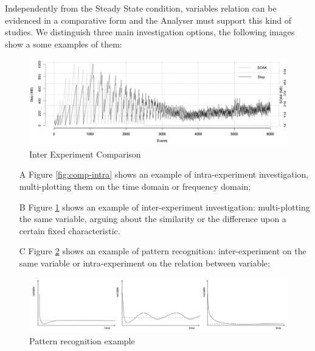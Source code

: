 Independently from the Steady State condition, variables relation can be evidenced in a comparative form and the Analyser must support this kind of studies. We distinguish three main investigation options, the following images show a some examples of them:

\begin{figure}[tbh]
  \centering
	\includegraphics[width=0.80\linewidth]{images/comp-inter}
	\caption{Inter Experiment Comparison} 
  	\label{fig:comp-inter}
\end{figure}

\begin{enumerate}
\item[A] Figure \ref{fig:comp-intra} shows an example of intra-experiment investigation, multi-plotting them on the time domain or frequency domain; 
\item[B] Figure \ref{fig:comp-inter} shows an example of inter-experiment investigation: multi-plotting the same variable, arguing about the similarity or the difference upon a certain fixed characteristic.  
\item[C] Figure \ref{fig:patterns}  shows an example of pattern recognition: inter-experiment on the same variable or intra-experiment on the relation between variable;
\end{enumerate}

\begin{figure}[tbh]
  \centering
	\includegraphics[width=0.85\linewidth]{images/patterns}
	\caption{Pattern recognition example} 
  	\label{fig:patterns}
\end{figure}

\pagebreak

